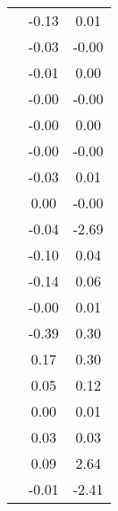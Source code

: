 \begin{table}
\begin{tabular}{c|cc|}
\multicolumn{1}{|c|}{} & \multicolumn{1}{|c|}{     -0.13} & \multicolumn{1}{|c|}{      0.01} \\ 
\multicolumn{1}{|c|}{} & \multicolumn{1}{|c|}{     -0.03} & \multicolumn{1}{|c|}{     -0.00} \\ 
\multicolumn{1}{|c|}{} & \multicolumn{1}{|c|}{     -0.01} & \multicolumn{1}{|c|}{      0.00} \\ 
\multicolumn{1}{|c|}{} & \multicolumn{1}{|c|}{     -0.00} & \multicolumn{1}{|c|}{     -0.00} \\ 
\multicolumn{1}{|c|}{} & \multicolumn{1}{|c|}{     -0.00} & \multicolumn{1}{|c|}{      0.00} \\ 
\multicolumn{1}{|c|}{} & \multicolumn{1}{|c|}{     -0.00} & \multicolumn{1}{|c|}{     -0.00} \\ 
\multicolumn{1}{|c|}{} & \multicolumn{1}{|c|}{     -0.03} & \multicolumn{1}{|c|}{      0.01} \\ 
\multicolumn{1}{|c|}{} & \multicolumn{1}{|c|}{      0.00} & \multicolumn{1}{|c|}{     -0.00} \\ 
\multicolumn{1}{|c|}{} & \multicolumn{1}{|c|}{     -0.04} & \multicolumn{1}{|c|}{     -2.69} \\ 
\multicolumn{1}{|c|}{} & \multicolumn{1}{|c|}{     -0.10} & \multicolumn{1}{|c|}{      0.04} \\ 
\multicolumn{1}{|c|}{} & \multicolumn{1}{|c|}{     -0.14} & \multicolumn{1}{|c|}{      0.06} \\ 
\multicolumn{1}{|c|}{} & \multicolumn{1}{|c|}{     -0.00} & \multicolumn{1}{|c|}{      0.01} \\ 
\multicolumn{1}{|c|}{} & \multicolumn{1}{|c|}{     -0.39} & \multicolumn{1}{|c|}{      0.30} \\ 
\multicolumn{1}{|c|}{} & \multicolumn{1}{|c|}{      0.17} & \multicolumn{1}{|c|}{      0.30} \\ 
\multicolumn{1}{|c|}{} & \multicolumn{1}{|c|}{      0.05} & \multicolumn{1}{|c|}{      0.12} \\ 
\multicolumn{1}{|c|}{} & \multicolumn{1}{|c|}{      0.00} & \multicolumn{1}{|c|}{      0.01} \\ 
\multicolumn{1}{|c|}{} & \multicolumn{1}{|c|}{      0.03} & \multicolumn{1}{|c|}{      0.03} \\ 
\multicolumn{1}{|c|}{} & \multicolumn{1}{|c|}{      0.09} & \multicolumn{1}{|c|}{      2.64} \\ 
\multicolumn{1}{|c|}{} & \multicolumn{1}{|c|}{     -0.01} & \multicolumn{1}{|c|}{     -2.41} \\ 

\end{tabular}
\end{table}
